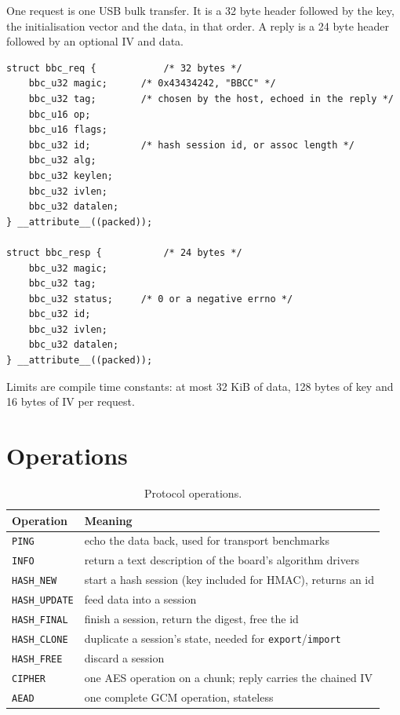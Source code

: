 \documentclass[11pt,a4paper,oneside]{report}
\newcommand{\code}[1]{\texttt{\small #1}}
\begin{document}
One request is one USB bulk transfer. It is a 32 byte header followed by the key, the initialisation vector and the data, in that order. A reply is a 24 byte header followed by an optional IV and data.

\begin{lstlisting}
struct bbc_req {            /* 32 bytes */
	bbc_u32 magic;      /* 0x43434242, "BBCC" */
	bbc_u32 tag;        /* chosen by the host, echoed in the reply */
	bbc_u16 op;
	bbc_u16 flags;
	bbc_u32 id;         /* hash session id, or assoc length */
	bbc_u32 alg;
	bbc_u32 keylen;
	bbc_u32 ivlen;
	bbc_u32 datalen;
} __attribute__((packed));

struct bbc_resp {           /* 24 bytes */
	bbc_u32 magic;
	bbc_u32 tag;
	bbc_u32 status;     /* 0 or a negative errno */
	bbc_u32 id;
	bbc_u32 ivlen;
	bbc_u32 datalen;
} __attribute__((packed));
\end{lstlisting}

Limits are compile time constants: at most 32 KiB of data, 128 bytes of key and 16 bytes of IV per request.

\section{Operations}

\begin{table}[ht]
\centering
\begin{tabularx}{\textwidth}{lX}
\toprule
Operation & Meaning \\
\midrule
\code{PING} & echo the data back, used for transport benchmarks \\
\code{INFO} & return a text description of the board's algorithm drivers \\
\code{HASH\_NEW} & start a hash session (key included for HMAC), returns an id \\
\code{HASH\_UPDATE} & feed data into a session \\
\code{HASH\_FINAL} & finish a session, return the digest, free the id \\
\code{HASH\_CLONE} & duplicate a session's state, needed for \code{export}/\code{import} \\
\code{HASH\_FREE} & discard a session \\
\code{CIPHER} & one AES operation on a chunk; reply carries the chained IV \\
\code{AEAD} & one complete GCM operation, stateless \\
\bottomrule
\end{tabularx}
\caption{Protocol operations.}
\end{table}
\end{document}
